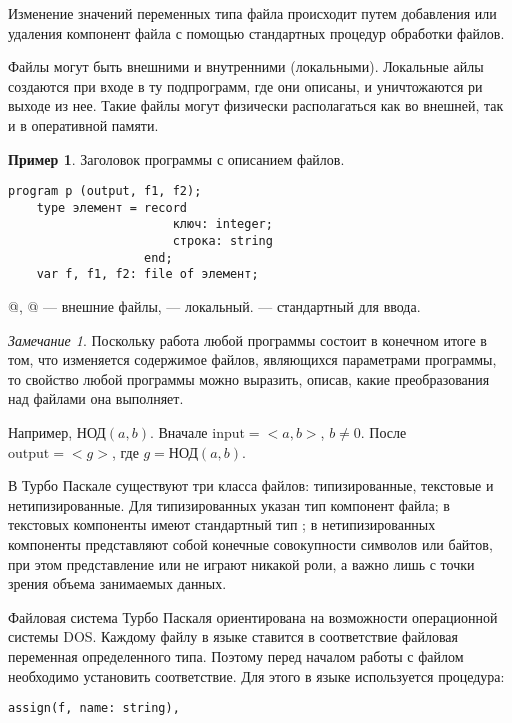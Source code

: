 \documentclass[12pt,a4paper]{article}
\theoremstyle{plain}
\theoremstyle{definition}
\newtheorem*{example}{Пример}
\theoremstyle{remark}
\newtheorem*{remark}{Замечание}
\begin{document}
Изменение значений переменных типа файла происходит путем добавления или удаления компонент файла с помощью стандартных процедур обработки файлов.

Файлы могут быть внешними и внутренними (локальными). Локальные айлы создаются при входе в ту подпрограмм, где они описаны, и уничтожаются ри выходе из нее. Такие файлы могут физически располагаться как во внешней, так и в оперативной памяти.

\begin{example}
Заголовок программы с описанием файлов.

\begin{verbatim}
program p (output, f1, f2);
    type элемент = record
                       ключ: integer;
                       строка: string
                   end;
    var f, f1, f2: file of элемент;
\end{verbatim}

@, @ --- внешние файлы, \verb@f@ --- локальный. \verb@output@ --- стандартный для ввода.
\end{example}

\begin{remark}
Поскольку работа любой программы состоит в конечном итоге в том, что изменяется содержимое файлов, являющихся параметрами программы, то свойство любой программы можно выразить, описав, какие преобразования над файлами она выполняет.

Например, $\text{НОД}(a,b)$. Вначале $\text{input}=<a,b>$, $b\ne0$. После $\text{output}=<g>$, где $g=\text{НОД}(a,b)$.
\end{remark}

В Турбо Паскале существуют три класса файлов: типизированные, текстовые и нетипизированные. Для типизированных указан тип компонент файла; в текстовых компоненты имеют стандартный тип \verb@TEXT@; в нетипизированных компоненты представляют собой конечные совокупности символов или байтов, при этом представление \verb@char@ или \verb@byte@ не играют никакой роли, а важно лишь с точки зрения объема занимаемых данных.

Файловая система Турбо Паскаля ориентирована на возможности операционной системы DOS. Каждому файлу в языке ставится в соответствие файловая переменная определенного типа. Поэтому перед началом работы с файлом необходимо установить соответствие. Для этого в языке используется процедура:

\begin{verbatim}
assign(f, name: string),
\end{verbatim}
\end{document}

